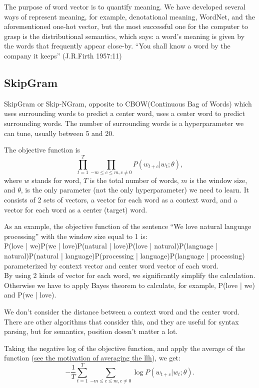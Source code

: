 \documentclass{report}
\begin{document}
The purpose of word vector is to quantify meaning. We have developed several ways of represent meaning, for example, denotational meaning, WordNet, and the aforementioned one-hot vector, but the most successful one for the computer to grasp is the distributional semantics, which says: a word's meaning is given by the words that frequently appear close-by.
{\center
``You shall know a word by the company it keeps'' (J.R.Firth 1957:11)}


\subsection{SkipGram}
SkipGram or Skip-NGram, opposite to CBOW(Continuous Bag of Words) which uses surrounding words to predict a center word, uses a center word to predict surrounding words. The number of surrounding words is a hyperparameter we can tune, usually between 5 and 20.

The objective function is \[
\prod_{t=1}^{T} \prod_{-m\le c \le m, c\neq 0} P(w_{t + c} | w_t; \theta)   
,\] 
where $w$ stands for word, $T$ is the total number of words, $m$ is the window size, and $\theta$, is the only parameter (not the only hyperparameter) we need to learn. It consists of 2 sets of vectors, a vector for each word as a context word, and a vector for each word as a center (target) word. 

As an example, the objective function of the sentence ``We love natural language processing'' with the window size equal to 1 is:\\ 
	P(love | we)P(we | love)P(natural | love)P(love | natural)P(language | natural)P(natural | language)P(processing | language)P(language | processing) parameterized by context vector and center word vector of each word. \\
	By using 2 kinds of vector for each word, we significantly simplify the calculation. Otherwise we have to apply Bayes theorem to calculate, for example, P(love | we) and P(we | love). 

	We don't consider the distance between a context word and the center word. There are other algorithms that consider this, and they are useful for syntax parsing, but for semantics, position doesn't matter a lot.

	Taking the negative log of the objective function, and apply the average of the function (\href{https://stats.stackexchange.com/q/267847/354019}{see the motivation of averaging the llh}), we get: \[
	-\frac{1}{T} \sum_{t=1}^{T} \sum_{-m \le c \le m, c \neq 0} \log P(w_{t+c} | w_t; \theta)	
	.\]
\end{document}
